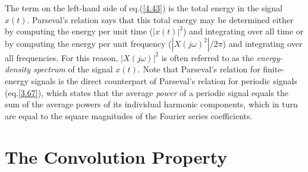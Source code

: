 \documentclass[a4paper,twoside]{book}
\begin{document}
The term on the left-hand side of eq.\;(\ref{4.43}) is the total energy in the signal $x(t)$. Parseval's relation says that this total energy may be determined either by computing the energy per unit time ($|x(t)|^2$) and integrating over all time or by computing the energy per unit frequency ($|X(j\omega)^2|/2\pi$) and integrating over all frequencies. For this reason, $|X(j\omega)|^2$ is often referred to as the \textit{energy-density spectrum} of the signal $x(t)$. Note that Parseval's relation for finite-energy signals is the direct counterpart of Parseval's relation for periodic signals (eq.\;\ref{3.67}), which states that the average \textit{power} of a periodic signal equals the sum of the average powers of its individual harmonic components, which in turn are equal to the square magnitudes of the Fourier series coefficients.

\section{The Convolution Property}
\end{document}
